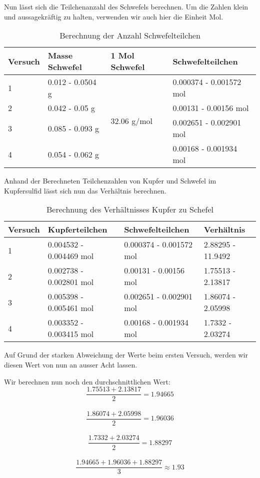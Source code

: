 \documentclass[11pt,paper=a4,final]{scrartcl}
\begin{document}
{Nun l\"asst sich die Teilchenanzahl des Schwefels berechnen. Um die Zahlen klein
und aussagekr\"aftig zu halten, verwenden wir auch hier die Einheit Mol.
\begin{table}[h!]
  \centering
  \begin{tabular}{|l|l|l|l|}\hline
    \bf Versuch & \bf Masse Schwefel & \bf 1 Mol Schwefel & \bf Schwefelteilchen
    \\ \hline
    1 & 0.012 - 0.0504 g & \multirow{4}{*}{32.06 g/mol} & 0.000374 - 0.001572
    mol \\ \cline{1-2} \cline{4-4}
    2 & 0.042 - 0.05 g & & 0.00131 - 0.00156 mol \\ \cline{1-2} \cline{4-4}
    3 & 0.085 - 0.093 g & & 0.002651 - 0.002901 mol \\ \cline{1-2} \cline{4-4}
    4 & 0.054 - 0.062 g & & 0.00168 - 0.001934 mol \\ \hline
  \end{tabular}
  \caption{Berechnung der Anzahl Schwefelteilchen}
  \label{tab:schwefelteilchen}
\end{table}

Anhand der Berechneten Teilchenzahlen von Kupfer und Schwefel im Kupfersulfid
l\"asst sich nun das Verh\"altnis berechnen.
\begin{table}[h!]
  \centering
  \begin{tabular}{|l|l|l|l|} \hline
    \bf Versuch & \bf Kupferteilchen & \bf Schwefelteilchen & \bf Verh\"altnis \\
    \hline
    1 & 0.004532 - 0.004469 mol & 0.000374 - 0.001572 mol & 2.88295 - 11.9492 \\
    \hline
    2 & 0.002738 - 0.002801 mol & 0.00131 - 0.00156 mol & 1.75513 - 2.13817 \\
    \hline
    3 & 0.005398 - 0.005461 mol & 0.002651 - 0.002901 mol & 1.86074 - 2.05998 \\
    \hline
    4 & 0.003352 - 0.003415 mol & 0.00168 - 0.001934 mol & 1.7332 - 2.03274 \\
    \hline
  \end{tabular}
  \caption{Berechnung des Verh\"altnisses Kupfer zu Schefel}
  \label{tab:verhaeltnis}
\end{table}

Auf Grund der starken Abweichung der Werte beim ersten Versuch, werden wir
diesen Wert von nun an ausser Acht lassen.

Wir berechnen nun noch den durchschnittlichen Wert:\\
\[  \frac{1.75513 + 2.13817}{2} = 1.94665 \]\\
\[  \frac{1.86074 + 2.05998}{2} = 1.96036 \]\\
\[  \frac{1.7332 + 2.03274}{2} = 1.88297 \]\\
\[  \frac{1.94665 + 1.96036 + 1.88297}{3} \approx 1.93 \]

}
\end{document}
